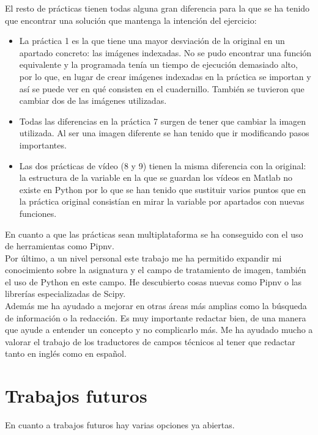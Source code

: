El resto de prácticas tienen todas alguna gran diferencia para la que se ha tenido que encontrar una solución que mantenga la intención del ejercicio:
\begin{itemize}
    \item La práctica 1 es la que tiene una mayor desviación de la original en un apartado concreto: las imágenes indexadas. No se pudo encontrar una función equivalente y la programada tenía un tiempo de ejecución demasiado alto, por lo que, en lugar de crear imágenes indexadas en la práctica se importan y así se puede ver en qué consisten en el cuadernillo. También se tuvieron que cambiar dos de las imágenes utilizadas.
    
    \item Todas las diferencias en la práctica 7 surgen de tener que cambiar la imagen utilizada. Al ser una imagen diferente se han tenido que ir modificando pasos importantes. 
   
    \item Las dos prácticas de vídeo (8 y 9) tienen la misma diferencia con la original: la estructura de la variable en la que se guardan los vídeos en Matlab no existe en Python por lo que se han tenido que sustituir varios puntos que en la práctica original consistían en mirar la variable por apartados con nuevas funciones. 
\end{itemize}


En cuanto a que las prácticas sean multiplataforma se ha conseguido con el uso de herramientas como Pipnv.\\

Por último, a un nivel personal este trabajo me ha permitido expandir mi conocimiento sobre la asignatura y el campo de tratamiento de imagen, también el uso de Python en este campo. He descubierto cosas nuevas como Pipnv o las librerías especializadas de Scipy. \\

Además me ha ayudado a mejorar en otras áreas más amplias como la búsqueda de información o la redacción. Es muy importante redactar bien, de una manera que ayude a entender un concepto y no complicarlo más. Me ha ayudado mucho a valorar el trabajo de los traductores de campos técnicos al tener que redactar tanto en inglés como en español.

\section{Trabajos futuros}

En cuanto a trabajos futuros hay varias opciones ya abiertas.\\

